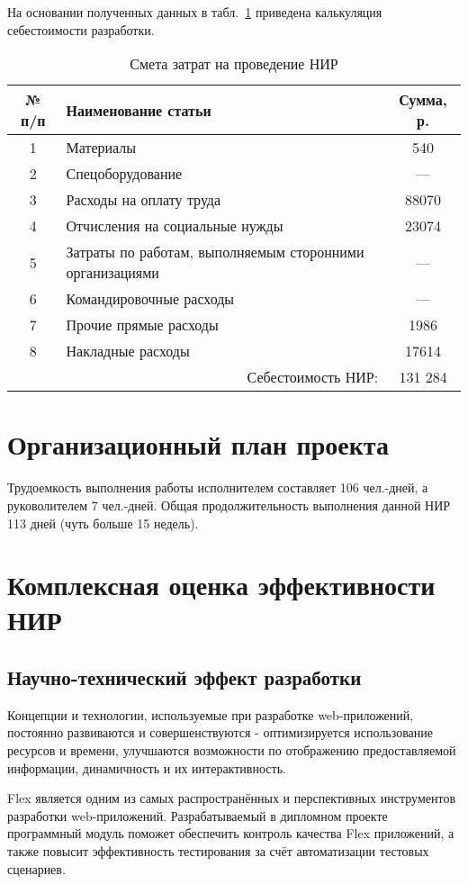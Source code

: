 На основании полученных данных в табл.~\ref{tab:calc} приведена калькуляция себестоимости разработки.

\begin{table}[ht]
\caption{Смета затрат на проведение НИР}
\begin{tabular}{|c|p{10cm}|c|}
\hline
№ п/п&Наименование статьи&Сумма, р.\\
\hline
1&Материалы&540\\
\hline
2&Спецоборудование&---\\
\hline
3&Расходы на оплату труда&88070\\
\hline
4&Отчисления на социальные нужды&23074\\
\hline
5&Затраты по работам, выполняемым сторонними организациями&---\\
\hline
6&Командировочные расходы&---\\
\hline
7&Прочие прямые расходы&1986\\
\hline
8&Накладные расходы&17614\\
\hline
\multicolumn{2}{|r|}{Себестоимость НИР:}&131 284\\
\hline
\end{tabular}
\label{tab:calc}
\end{table}

\section{Организационный план проекта}

Трудоемкость выполнения работы исполнителем  составляет 106 чел.-дней, а руковолителем 7 чел.-дней.
Общая продолжительность выполнения данной НИР 113 дней (чуть больше 15 недель).

\section{Комплексная оценка эффективности НИР}

\subsection{Научно-технический эффект разработки}

Концепции и технологии, используемые при разработке web-приложений,
постоянно развиваются и совершенствуются - оптимизируется использование ресурсов и времени,
улучшаются возможности по отображению предоставляемой информации, динамичность и их интерактивность.

Flex является одним из самых распространённых и перспективных инструментов разработки web-приложений.
Разрабатываемый в дипломном проекте программный модуль поможет обеспечить контроль качества Flex
приложений, а также повысит эффективность тестирования за счёт автоматизации тестовых сценариев.

